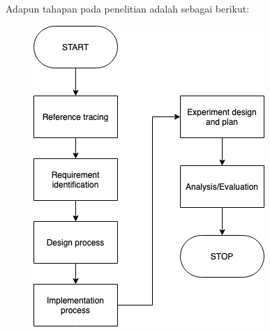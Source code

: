Adapun tahapan pada penelitian adalah sebagai berikut:

\begin{figure}[H]
	\centering
	\includegraphics[width=0.7\linewidth]{figure/Metode-Penelitian-flow.png}
	\caption[Metode Penelitian]{}
	\label{fig:metode-penelitian-flow}
\end{figure}



